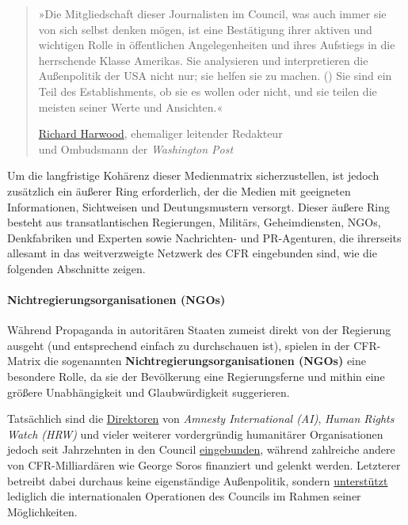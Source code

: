 \begin{quote}
»Die Mitgliedschaft dieser Journalisten im Council, was auch immer sie
von sich selbst denken mögen, ist eine Bestätigung ihrer aktiven und
wichtigen Rolle in öffentlichen Angelegenheiten und ihres Aufstiegs in
die herrschende Klasse Amerikas. Sie analysieren und interpretieren die
Außenpolitik der USA nicht nur; sie helfen sie zu machen. () Sie sind
ein Teil des Establishments, ob sie es wollen oder nicht, und sie teilen
die meisten seiner Werte und Ansichten.«

\href{https://www.washingtonpost.com/archive/opinions/1993/10/30/ruling-class-journalists/761e7bf8-025d-474e-81cb-92dcf271571e/}{Richard
Harwood}, ehemaliger leitender Redakteur\\
und Ombudsmann der \emph{Washington Post}
\end{quote}

Um die langfristige Kohärenz dieser Medienmatrix sicherzustellen, ist
jedoch zusätzlich ein äußerer Ring erforderlich, der die Medien mit
geeigneten Informationen, Sichtweisen und Deutungs­mustern versorgt.
Dieser äußere Ring besteht aus trans­atlantischen Regierungen, Militärs,
Geheim­diensten, NGOs, Denkfabriken und Experten sowie Nachrichten- und
PR-Agenturen, die ihrerseits allesamt in das weitverzweigte Netzwerk des
CFR eingebunden sind, wie die folgenden Abschnitte zeigen.

\hypertarget{nichtregierungsorganisationen-ngos}{%
\paragraph{Nichtregierungsorganisationen
(NGOs)}\label{nichtregierungsorganisationen-ngos}}

Während Propaganda in autoritären Staaten zumeist direkt von der
Regierung ausgeht (und entsprechend einfach zu durchschauen ist),
spielen in der CFR-Matrix die sogenannten
\textbf{Nicht­­regierungs­­organisationen (NGOs)} eine besondere Rolle,
da sie der Bevölkerung eine Regierungsferne und mithin eine größere
Unabhängigkeit und Glaubwürdigkeit suggerieren.

Tatsächlich sind die
\href{http://foreignpolicy.com/2011/11/17/names-nossel-to-head-amnesty-international-usa/}{Direktoren}
von \emph{Amnesty International (AI)}, \emph{Human Rights Watch (HRW)}
und vieler weiterer vordergründig humanitärer Organisationen jedoch seit
Jahrzehnten in den Council
\href{https://swprs.files.wordpress.com/2018/02/cfr-imperial-council-hdv.png}{ein­ge­bunden},
während zahlreiche andere von CFR-Milliardären wie George Soros
finanziert und gelenkt werden. Letzterer betreibt dabei durchaus keine
eigen­ständige Außen­politik, sondern
\href{http://www.nybooks.com/articles/2015/10/08/ukraine-europe-what-should-be-done/}{unter­stützt}
ledig­lich die inter­na­tionalen Opera­tionen des Councils im Rahmen
seiner Möglichkeiten.

